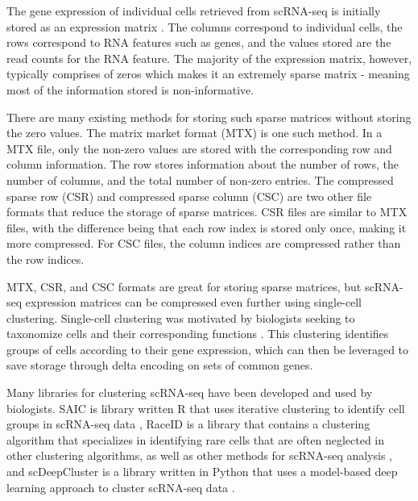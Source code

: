 \documentclass[unnumsec,webpdf,contemporary,large]{oup-authoring-template}
\begin{document}
The gene expression of individual cells retrieved from scRNA-seq is initially stored as an expression matrix \cite{rna_seq_teenage_years}. The columns correspond to individual cells, the rows correspond to RNA features such as genes, and the values stored are the read counts for the RNA feature. The majority of the expression matrix, however, typically comprises of zeros which makes it an extremely sparse matrix - meaning most of the information stored is non-informative.

There are many existing methods for storing such sparse matrices without storing the zero values. The matrix market format (MTX) is one such method. In a MTX file, only the non-zero values are stored with the corresponding row and column information. The row stores information about the number of rows, the number of columns, and the total number of non-zero entries. The compressed sparse row (CSR) and compressed sparse column (CSC) are two other file formats that reduce the storage of sparse matrices. CSR files are similar to MTX files, with the difference being that each row index is stored only once, making it more compressed. For CSC files, the column indices are compressed rather than the row indices.

MTX, CSR, and CSC formats are great for storing sparse matrices, but scRNA-seq expression matrices can be compressed even further using single-cell clustering. Single-cell clustering was motivated by biologists seeking to taxonomize cells and their corresponding functions \cite{clusters_for_taxonomy1, clusters_for_taxonomy2}. This clustering identifies groups of cells according to their gene expression, which can then be leveraged to save storage through delta encoding on sets of common genes.

Many libraries for clustering scRNA-seq have been developed and used by biologists. SAIC is library written R that uses iterative clustering to identify cell groups in scRNA-seq data \cite{SAIC}, RaceID is a library that contains a clustering algorithm that specializes in identifying rare cells that are often neglected in other clustering algorithms, as well as other methods for scRNA-seq analysis \cite{raceID}, and scDeepCluster is a library written in Python that uses a model-based deep learning approach to cluster scRNA-seq data \cite{scDeepCluster}. 
\end{document}

